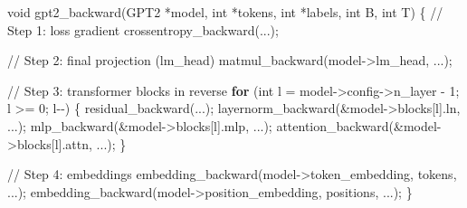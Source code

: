 \documentclass[
  letterpaper,
  DIV=11,
  numbers=noendperiod]{scrreprt}
\newenvironment{Shaded}{\begin{snugshade}}{\end{snugshade}}
\newcommand{\CommentTok}[1]{\textcolor[rgb]{0.37,0.37,0.37}{#1}}
\newcommand{\ControlFlowTok}[1]{\textcolor[rgb]{0.00,0.23,0.31}{\textbf{#1}}}
\newcommand{\DataTypeTok}[1]{\textcolor[rgb]{0.68,0.00,0.00}{#1}}
\newcommand{\DecValTok}[1]{\textcolor[rgb]{0.68,0.00,0.00}{#1}}
\newcommand{\NormalTok}[1]{\textcolor[rgb]{0.00,0.23,0.31}{#1}}
\newcommand{\OperatorTok}[1]{\textcolor[rgb]{0.37,0.37,0.37}{#1}}
\begin{document}
\begin{Shaded}
\begin{Highlighting}[]
\DataTypeTok{void}\NormalTok{ gpt2\_backward}\OperatorTok{(}\NormalTok{GPT2 }\OperatorTok{*}\NormalTok{model}\OperatorTok{,} \DataTypeTok{int} \OperatorTok{*}\NormalTok{tokens}\OperatorTok{,} \DataTypeTok{int} \OperatorTok{*}\NormalTok{labels}\OperatorTok{,} \DataTypeTok{int}\NormalTok{ B}\OperatorTok{,} \DataTypeTok{int}\NormalTok{ T}\OperatorTok{)} \OperatorTok{\{}
    \CommentTok{// Step 1: loss gradient}
\NormalTok{    crossentropy\_backward}\OperatorTok{(...);}

    \CommentTok{// Step 2: final projection (lm\_head)}
\NormalTok{    matmul\_backward}\OperatorTok{(}\NormalTok{model}\OperatorTok{{-}\textgreater{}}\NormalTok{lm\_head}\OperatorTok{,} \OperatorTok{...);}

    \CommentTok{// Step 3: transformer blocks in reverse}
    \ControlFlowTok{for} \OperatorTok{(}\DataTypeTok{int}\NormalTok{ l }\OperatorTok{=}\NormalTok{ model}\OperatorTok{{-}\textgreater{}}\NormalTok{config}\OperatorTok{{-}\textgreater{}}\NormalTok{n\_layer }\OperatorTok{{-}} \DecValTok{1}\OperatorTok{;}\NormalTok{ l }\OperatorTok{\textgreater{}=} \DecValTok{0}\OperatorTok{;}\NormalTok{ l}\OperatorTok{{-}{-})} \OperatorTok{\{}
\NormalTok{        residual\_backward}\OperatorTok{(...);}
\NormalTok{        layernorm\_backward}\OperatorTok{(\&}\NormalTok{model}\OperatorTok{{-}\textgreater{}}\NormalTok{blocks}\OperatorTok{[}\NormalTok{l}\OperatorTok{].}\NormalTok{ln}\OperatorTok{,} \OperatorTok{...);}
\NormalTok{        mlp\_backward}\OperatorTok{(\&}\NormalTok{model}\OperatorTok{{-}\textgreater{}}\NormalTok{blocks}\OperatorTok{[}\NormalTok{l}\OperatorTok{].}\NormalTok{mlp}\OperatorTok{,} \OperatorTok{...);}
\NormalTok{        attention\_backward}\OperatorTok{(\&}\NormalTok{model}\OperatorTok{{-}\textgreater{}}\NormalTok{blocks}\OperatorTok{[}\NormalTok{l}\OperatorTok{].}\NormalTok{attn}\OperatorTok{,} \OperatorTok{...);}
    \OperatorTok{\}}

    \CommentTok{// Step 4: embeddings}
\NormalTok{    embedding\_backward}\OperatorTok{(}\NormalTok{model}\OperatorTok{{-}\textgreater{}}\NormalTok{token\_embedding}\OperatorTok{,}\NormalTok{ tokens}\OperatorTok{,} \OperatorTok{...);}
\NormalTok{    embedding\_backward}\OperatorTok{(}\NormalTok{model}\OperatorTok{{-}\textgreater{}}\NormalTok{position\_embedding}\OperatorTok{,}\NormalTok{ positions}\OperatorTok{,} \OperatorTok{...);}
\OperatorTok{\}}
\end{Highlighting}
\end{Shaded}
\end{document}
